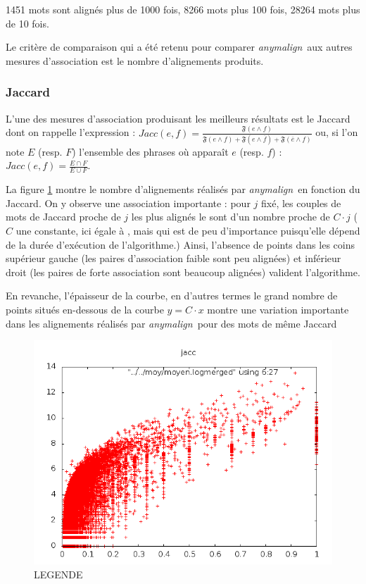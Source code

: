 \documentclass[a4paper,10pt]{article}
\newcommand{\anym}{\emph{anymalign}}
\begin{document}
1451 mots sont alignés plus de 1000 fois, 8266 mots plus 100 fois, 28264 mots plus de 10 fois.

Le critère de comparaison qui a été retenu pour comparer \anym~aux autres mesures d'association est le nombre d'alignements produits. %

\subsubsection{Jaccard}

L'une des mesures d'association produisant les meilleurs résultats est le Jaccard dont on rappelle l'expression : $Jacc(e,f)=\frac{\mathfrak{F}(e\wedge f)}{\mathfrak{F}(e\wedge f)+\mathfrak{F}(e\wedge\overline{f})+\mathfrak{F}(\overline{e}\wedge f)}$ ou, si l'on note $E$ (resp. $F$) l'ensemble des phrases où apparaît $e$ (resp. $f$) : $Jacc(e,f)=\frac{E\cap F}{E\cup F}$.

La figure \ref{jaccard} montre le nombre d'alignements %
 réalisés par \anym~en fonction du Jaccard. On y observe une association importante : 
pour $j$ fixé, les couples de mots de Jaccard proche de $j$ les plus alignés le sont d'un nombre proche de $C\cdot j$ ($C$ une constante, ici égale à %
, mais qui est de peu d'importance puisqu'elle dépend de la durée d'exécution de l'algorithme.) Ainsi, l'absence de points dans les coins supérieur gauche (les paires d'association faible sont peu alignées) et inférieur droit (les paires de forte association sont beaucoup alignées) valident l'algorithme.

En revanche, l'épaisseur de la courbe, en d'autres termes le grand nombre de points situés en-dessous de la courbe $y = C\cdot x$ montre une variation importante dans les alignements réalisés par \anym~pour des mots de même Jaccard

\begin{figure}[t]
\centering
\label{jaccard}
\includegraphics[width=12cm]{jacclog.png} %
\caption{LEGENDE} %
\end{figure}
\end{document}
